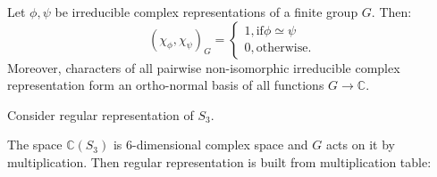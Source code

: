 \documentclass{amsart}
\begin{document}
\begin{theorem}
    Let $\phi, \psi$ be irreducible complex representations of a finite group $G$. Then:
    $$(\chi_\phi, \chi_\psi)_G = 
    \begin{cases}
        1, \text{if} \phi \simeq \psi\\
        0, \text{otherwise}.
    \end{cases}
    $$
    Moreover, characters of all pairwise non-isomorphic irreducible complex representation form an ortho-normal basis of all functions $G\to \mathbb{C}$.
\end{theorem}

\begin{example}
    Consider regular representation of $S_3$. 
\end{example}

The space $\mathbb{C} (S_3)$ is 6-dimensional complex space and $G$ acts on it by multiplication. Then regular representation is built from multiplication table:
\end{document}
